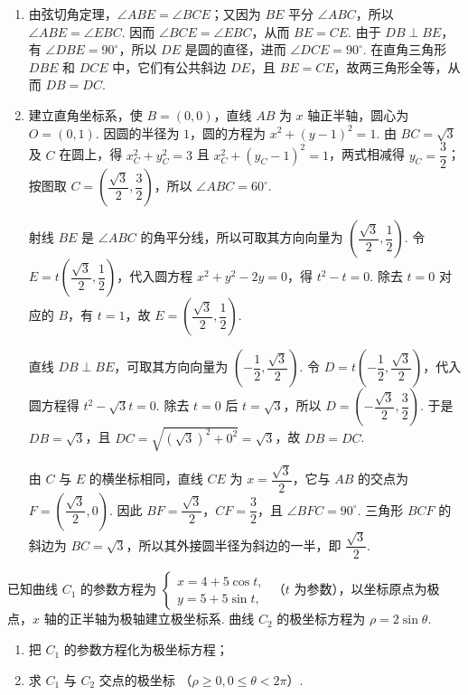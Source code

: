 \begin{solution}
\begin{enumerate}
\item 由弦切角定理，\(\angle ABE=\angle BCE\)；又因为 \(BE\) 平分 \(\angle ABC\)，所以 \(\angle ABE=\angle EBC\). 因而 \(\angle BCE=\angle EBC\)，从而 \(BE=CE\). 由于 \(DB\perp BE\)，有 \(\angle DBE=90^\circ\)，所以 \(DE\) 是圆的直径，进而 \(\angle DCE=90^\circ\). 在直角三角形 \(DBE\) 和 \(DCE\) 中，它们有公共斜边 \(DE\)，且 \(BE=CE\)，故两三角形全等，从而 \(DB=DC\).

\item 建立直角坐标系，使 \(B=(0,0)\)，直线 \(AB\) 为 \(x\) 轴正半轴，圆心为 \(O=(0,1)\). 因圆的半径为 \(1\)，圆的方程为 \(x^2+(y-1)^2=1\). 由 \(BC=\sqrt3\) 及 \(C\) 在圆上，得 \(x_C^2+y_C^2=3\) 且 \(x_C^2+(y_C-1)^2=1\)，两式相减得 \(y_C=\dfrac32\)；按图取 \(C=\left(\dfrac{\sqrt3}{2},\dfrac32\right)\)，所以 \(\angle ABC=60^\circ\).

射线 \(BE\) 是 \(\angle ABC\) 的角平分线，所以可取其方向向量为 \(\left(\dfrac{\sqrt3}{2},\dfrac12\right)\). 令 \(E=t\left(\dfrac{\sqrt3}{2},\dfrac12\right)\)，代入圆方程 \(x^2+y^2-2y=0\)，得 \(t^2-t=0\). 除去 \(t=0\) 对应的 \(B\)，有 \(t=1\)，故 \(E=\left(\dfrac{\sqrt3}{2},\dfrac12\right)\).

直线 \(DB\perp BE\)，可取其方向向量为 \(\left(-\dfrac12,\dfrac{\sqrt3}{2}\right)\). 令 \(D=t\left(-\dfrac12,\dfrac{\sqrt3}{2}\right)\)，代入圆方程得 \(t^2-\sqrt3t=0\). 除去 \(t=0\) 后 \(t=\sqrt3\)，所以 \(D=\left(-\dfrac{\sqrt3}{2},\dfrac32\right)\). 于是 \(DB=\sqrt3\)，且
\(DC=\sqrt{\left(\sqrt3\right)^2+0^2}=\sqrt3\)，故 \(DB=DC\).

由 \(C\) 与 \(E\) 的横坐标相同，直线 \(CE\) 为 \(x=\dfrac{\sqrt3}{2}\)，它与 \(AB\) 的交点为 \(F=\left(\dfrac{\sqrt3}{2},0\right)\). 因此 \(BF=\dfrac{\sqrt3}{2}\)，\(CF=\dfrac32\)，且 \(\angle BFC=90^\circ\). 三角形 \(BCF\) 的斜边为 \(BC=\sqrt3\)，所以其外接圆半径为斜边的一半，即 \(\dfrac{\sqrt3}{2}\).
\end{enumerate}
\end{solution}

\begin{problem}
已知曲线 \(C_1\) 的参数方程为 \(\begin{cases}
x = 4 + 5\cos t,\\
y = 5 + 5\sin t,
\end{cases}\) （\(t\) 为参数），以坐标原点为极点，\(x\) 轴的正半轴为极轴建立极坐标系. 曲线 \(C_2\) 的极坐标方程为 \(\rho = 2\sin \theta\).
\begin{enumerate}
\item 把 \(C_1\) 的参数方程化为极坐标方程；
\item 求 \(C_1\) 与 \(C_2\) 交点的极坐标 （\(\rho \geqslant 0, 0 \leqslant \theta < 2\pi\)）.
\end{enumerate}
\end{problem}

